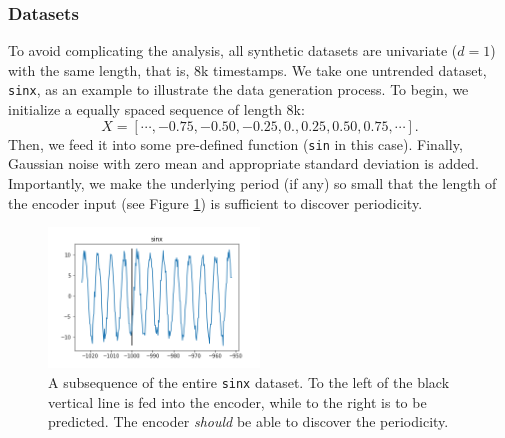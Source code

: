 \subsubsection{Datasets}
To avoid complicating the analysis, all synthetic datasets are univariate ($d = 1$) with the same length, that is, 8k timestamps. 
We take one untrended dataset, \texttt{sinx}, as an example to illustrate the data generation process. 
To begin, we initialize a equally spaced sequence of length 8k: $$X = [\cdots, -0.75, -0.50, -0.25, 0., 0.25, 0.50, 0.75, \cdots].$$
Then, we feed it into some pre-defined function (\texttt{sin} in this case). 
Finally, Gaussian noise with zero mean and appropriate standard deviation is added. 
Importantly, we make the underlying period (if any) so small that the length of the encoder input (see Figure \ref{fig:sinx}) is sufficient to discover periodicity. 

\begin{figure}
    \centering
    \includegraphics[width=0.5\textwidth]{img/data_sinx.png}
    \caption{A subsequence of the entire \texttt{sinx} dataset. 
    To the left of the black vertical line is fed into the encoder, while to the right is to be predicted. 
    The encoder \textit{should} be able to discover the periodicity.}
    \label{fig:sinx}
\end{figure}


